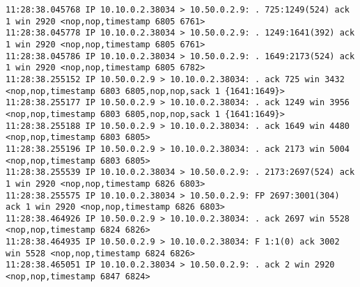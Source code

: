 \documentclass[a4paper,12pt]{article}
\begin{document}
\begin{Verbatim}
11:28:38.045768 IP 10.10.0.2.38034 > 10.50.0.2.9: . 725:1249(524) ack 1 win 2920 <nop,nop,timestamp 6805 6761>
11:28:38.045778 IP 10.10.0.2.38034 > 10.50.0.2.9: . 1249:1641(392) ack 1 win 2920 <nop,nop,timestamp 6805 6761>
11:28:38.045786 IP 10.10.0.2.38034 > 10.50.0.2.9: . 1649:2173(524) ack 1 win 2920 <nop,nop,timestamp 6805 6782>
11:28:38.255152 IP 10.50.0.2.9 > 10.10.0.2.38034: . ack 725 win 3432 <nop,nop,timestamp 6803 6805,nop,nop,sack 1 {1641:1649}>
11:28:38.255177 IP 10.50.0.2.9 > 10.10.0.2.38034: . ack 1249 win 3956 <nop,nop,timestamp 6803 6805,nop,nop,sack 1 {1641:1649}>
11:28:38.255188 IP 10.50.0.2.9 > 10.10.0.2.38034: . ack 1649 win 4480 <nop,nop,timestamp 6803 6805>
11:28:38.255196 IP 10.50.0.2.9 > 10.10.0.2.38034: . ack 2173 win 5004 <nop,nop,timestamp 6803 6805>
11:28:38.255539 IP 10.10.0.2.38034 > 10.50.0.2.9: . 2173:2697(524) ack 1 win 2920 <nop,nop,timestamp 6826 6803>
11:28:38.255575 IP 10.10.0.2.38034 > 10.50.0.2.9: FP 2697:3001(304) ack 1 win 2920 <nop,nop,timestamp 6826 6803>
11:28:38.464926 IP 10.50.0.2.9 > 10.10.0.2.38034: . ack 2697 win 5528 <nop,nop,timestamp 6824 6826>
11:28:38.464935 IP 10.50.0.2.9 > 10.10.0.2.38034: F 1:1(0) ack 3002 win 5528 <nop,nop,timestamp 6824 6826>
11:28:38.465051 IP 10.10.0.2.38034 > 10.50.0.2.9: . ack 2 win 2920 <nop,nop,timestamp 6847 6824>


\end{Verbatim}
\end{document}

